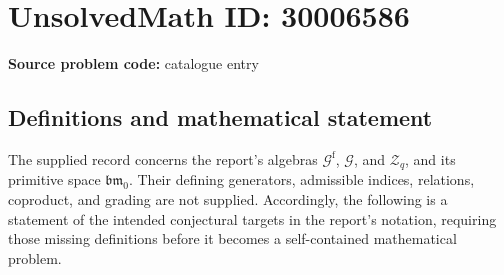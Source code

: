 \documentclass[11pt]{article}
\begin{document}
\section*{UnsolvedMath ID: 30006586}
\textbf{Source problem code:} catalogue entry
\subsection{Definitions and mathematical statement}
The supplied record concerns the report's algebras \(\mathcal G^{\mathrm f}\), \(\mathcal G\), and \(\mathcal Z_q\), and its primitive space \(\mathfrak{bm}_0\). Their defining generators, admissible indices, relations, coproduct, and grading are not supplied. Accordingly, the following is a statement of the intended conjectural targets in the report's notation, requiring those missing definitions before it becomes a self-contained mathematical problem.
\end{document}
